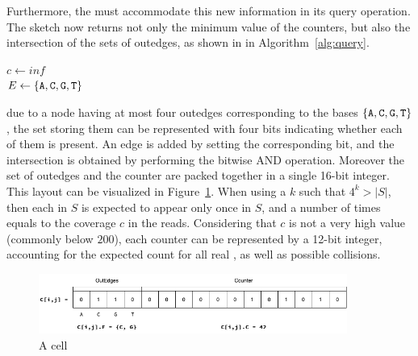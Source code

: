 \begin{algorithm}[htbp]
    \caption{$C.\mathit{add\_outedge}(X, a)$}\label{alg:addOutEdge}
\end{algorithm}

Furthermore, the \dBCM must accommodate this new information in its query operation. The sketch now returns not only the minimum value of the counters, but also the intersection of the sets of outedges, as shown in in Algorithm~\ref{alg:query}.

\begin{algorithm}
	\caption{$C.\mathit{query}(X)$}\label{alg:query}
	$c \gets \mathit{inf}$\\
	$E \gets \{\mathtt{A}, \mathtt{C}, \mathtt{G}, \mathtt{T}\}$\\
\end{algorithm}

 due to a node having at most four outedges corresponding to the bases $\{\mathtt{A}, \mathtt{C}, \mathtt{G}, \mathtt{T}\}$, the set storing them can be represented with four bits indicating whether each of them is present. An edge is added by setting the corresponding bit, and the intersection is obtained by performing the bitwise AND operation. Moreover the set of outedges and the counter are packed together in a single 16-bit integer. This layout can be visualized in Figure~\ref{fig:dbcm-bit_use}. When using a $k$ such that $4^k > |S|$, then each \kmer in $S$ is expected to appear only once in $S$, and a number of times equals to the coverage $c$ in the reads. Considering that $c$ is not a very high value (commonly below $200$), each counter can be represented by a 12-bit integer, accounting for the expected count for all real , as well as possible collisions.

\begin{figure}[htbp]
  \centering
  \includegraphics[width=0.9\textwidth]{figures/dbcm-bit_use}
  \caption{A \dBCM cell}\label{fig:dbcm-bit_use}
\end{figure}


